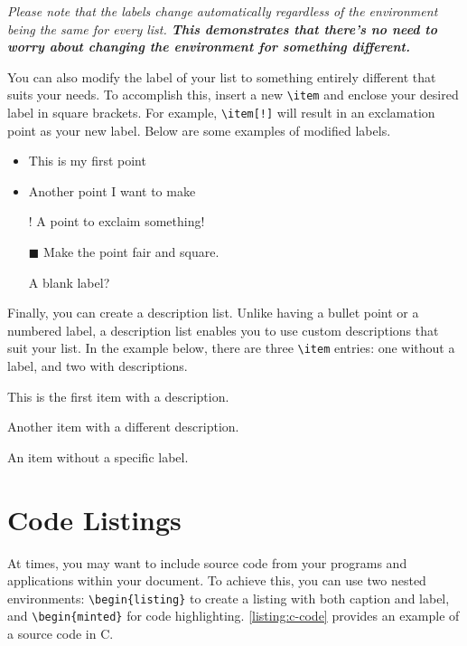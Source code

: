 {	\begin{block}[tip]
		\textit{Please note that the labels change automatically regardless of the environment being the same for every list. \textbf{This demonstrates that there's no need to worry about changing the environment for something different.}}
	\end{block}

	You can also modify the label of your list to something entirely different that suits your needs. To accomplish this, insert a new \verb|\item| and enclose your desired label in square brackets. For example, \verb|\item[!]| will result in an exclamation point as your new label. Below are some examples of modified labels.

	\begin{itemize}
		\item This is my first point
		\item Another point I want to make
		\item[!] A point to exclaim something!
		\item[$\blacksquare$] Make the point fair and square.
		\item[] A blank label?
	\end{itemize}

	Finally, you can create a description list. Unlike having a bullet point or a numbered label, a description list enables you to use custom descriptions that suit your list. In the example below, there are three \verb|\item| entries: one without a label, and two with descriptions.

	\begin{description}
		\item[Item 1:] This is the first item with a description.
		\item[Item 2:] Another item with a different description.
		\item An item without a specific label.
	\end{description}

	\section{Code Listings}
	At times, you may want to include source code from your programs and applications within your document. To achieve this, you can use two nested environments: \verb|\begin{listing}| to create a listing with both caption and label, and \verb|\begin{minted}| for code highlighting. \autoref{listing:c-code} provides an example of a source code in C.

}
